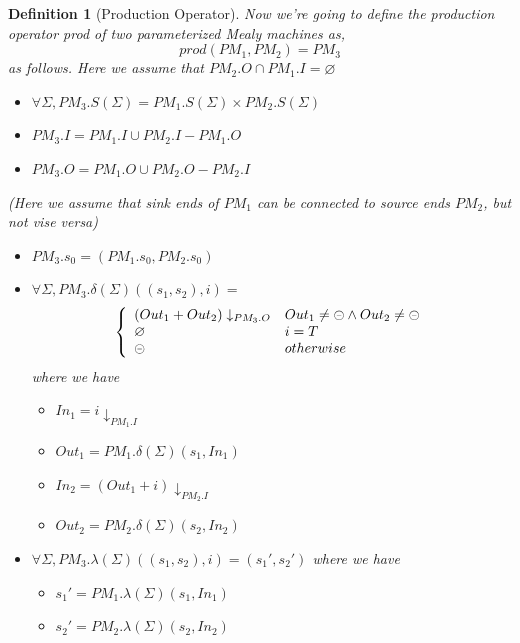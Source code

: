 \documentclass[conference, a4paper]{IEEEtran}
\newtheorem{definition}{Definition}
\newcommand{\rblock}[0]{\circleddash}
\newcommand{\rempty}[0]{\varnothing}
\begin{document}
\begin{definition}[Production Operator]
  Now we're going to define the production operator \emph{prod} of two parameterized Mealy machines as,
  \[
  prod(PM_1,PM_2)=PM_3
  \]
  as follows. Here we assume that $PM_2.O\cap PM_1.I=\varnothing$
  \begin{itemize}
  	\item[-] $\forall\Sigma, PM_3.S(\Sigma)=PM_1.S(\Sigma)\times PM_2.S(\Sigma)$
    \item[-] $PM_3.I=PM_1.I\cup PM_2.I-PM_1.O$
    \item[-] $PM_3.O=PM_1.O\cup PM_2.O-PM_2.I$
  \end{itemize}
  \emph{(Here we assume that sink ends of $PM_1$ can be connected to source ends $PM_2$, but not
  vise versa)}
  \begin{itemize}
    \item[-] $PM_3.s_0=(PM_1.s_0, PM_2.s_0)$
    \item[-] $\forall\Sigma, PM_3.\delta(\Sigma)((s_1,s_2), i)=$
      \begin{displaymath}
        \left\{
        \begin{array}[ht]{ll}
          (Out_1 + Out_2)\downarrow_{PM_3.O} & Out_1\neq\rblock\land Out_2\neq\rblock \\
          \rempty & i = T \\
          \rblock & otherwise \\
        \end{array}
        \right.
      \end{displaymath}
      where we have
      \begin{itemize}
        \item[*] $In_1 = i\downarrow_{PM_1.I}$
        \item[*] $Out_1 = PM_1.\delta(\Sigma)(s_1,In_1)$
        \item[*] $In_2 = (Out_1 + i)\downarrow_{PM_2.I}$
        \item[*] $Out_2 = PM_2.\delta(\Sigma)(s_2,In_2)$
      \end{itemize}
    \item[-] $\forall\Sigma, PM_3. \lambda(\Sigma)((s_1,s_2),i)=(s_1',s_2')$
      where we have
      \begin{itemize}
        \item[*] $s_1' = PM_1.\lambda(\Sigma)(s_1,In_1)$
        \item[*] $s_2' = PM_2.\lambda(\Sigma)(s_2,In_2)$
      \end{itemize}
  \end{itemize}
\end{definition}
\end{document}
